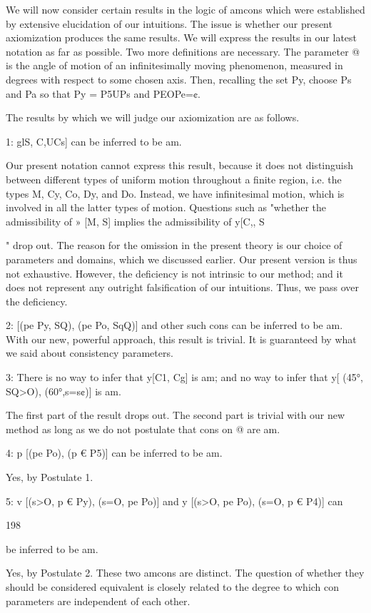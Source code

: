 \documentclass[10pt,twoside]{memoir}
\begin{document}
\begin{enumerate}
{\begin{enumerate}
\begin{sysrules}
\begin{sysrules}
\begin{sysrules}
\begin{sysrules}
{\begin{enumerate}
{{{{{{{{{We will now consider certain results in the logic of amcons which were 
established by extensive elucidation of our intuitions. The issue is whether 
our present axiomization produces the same results. We will express the 
results in our latest notation as far as possible. Two more definitions are 
necessary. The parameter @ is the angle of motion of an infinitesimally 
moving phenomenon, measured in degrees with respect to some chosen axis. 
Then, recalling the set Py, choose Ps and Pa so that Py = P5UPs and 
PEOPe=¢. 

The results by which we will judge our axiomization are as follows. 

1: glS, C,UCs] can be inferred to be am. 

Our present notation cannot express this result, because it does not 
distinguish between different types of uniform motion throughout a finite 
region, i.e. the types M, Cy, Co, Dy, and Do. Instead, we have infinitesimal 
motion, which is involved in all the latter types of motion. Questions such as 
"whether the admissibility of » [M, S] implies the admissibility of y[C,, S}" 
drop out. The reason for the omission in the present theory is our choice of 
parameters and domains, which we discussed earlier. Our present version is 
thus not exhaustive. However, the deficiency is not intrinsic to our method; 
and it does not represent any outright falsification of our intuitions. Thus, 
we pass over the deficiency. 

2: [(pe Py, SQ), (pe Po, SqQ)] and other such cons can be inferred to be am. 
With our new, powerful approach, this result is trivial. It is guaranteed by 
what we said about consistency parameters. 

3: There is no way to infer that y[C1, Cg] is am; and no way to infer that 
y[ (45°, SQ>O), (60°,s=s¢)] is am. 

The first part of the result drops out. The second part is trivial with our new 
method as long as we do not postulate that cons on @ are am. 

4: p [(pe Po), (p € P5)] can be inferred to be am. 

Yes, by Postulate 1. 

5: v [(s>O, p € Py), (s=O, pe Po)] and y [(s>O, pe Po), (s=O, p € P4)] can 


198 


be inferred to be am. 

Yes, by Postulate 2. These two amcons are distinct. The question of whether 
they should be considered equivalent is closely related to the degree to 
which con parameters are independent of each other. 

}}}}}}}}
\end{enumerate}}
\end{sysrules}
\end{sysrules}
\end{sysrules}
\end{sysrules}
\end{enumerate}}
\end{enumerate}
\end{document}
